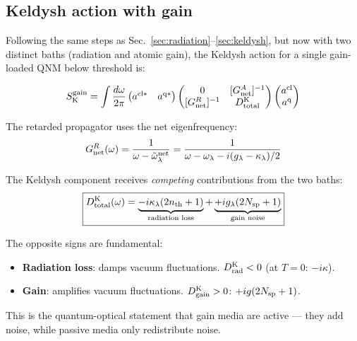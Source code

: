 \documentclass[12pt]{article}
\newcommand{\cl}{{\rm cl}}
\newcommand{\q}{{\rm q}}
\newcommand{\Keldysh}{{\rm K}}
\newcommand{\tomega}{\tilde{\omega}}
\begin{document}
\subsection{Keldysh action with gain}
\label{sec:keldysh_gain}

Following the same steps as Sec.~\ref{sec:radiation}--\ref{sec:keldysh},
but now with two distinct baths (radiation and atomic gain), the Keldysh
action for a single gain-loaded QNM below threshold is:

\begin{equation}
  S_\Keldysh^{\rm gain} = \int\frac{d\omega}{2\pi}
  \begin{pmatrix}a^{\cl*} & a^{\q*}\end{pmatrix}
  \begin{pmatrix}
    0 & [G^A_{\rm net}]^{-1}\\
    [G^R_{\rm net}]^{-1} & D^\Keldysh_{\rm total}
  \end{pmatrix}
  \begin{pmatrix}a^\cl\\a^\q\end{pmatrix}
  \label{eq:keldysh_gain_action}
\end{equation}

The retarded propagator uses the net eigenfrequency:
\begin{equation}
  G^R_{\rm net}(\omega) =
  \frac{1}{\omega - \tomega_\lambda^{\rm net}}
  = \frac{1}{\omega - \omega_\lambda - i(g_\lambda-\kappa_\lambda)/2}
  \label{eq:GR_net}
\end{equation}

The Keldysh component receives \emph{competing} contributions from the
two baths:
\begin{equation}
  \boxed{
  D^\Keldysh_{\rm total}(\omega) =
  \underbrace{-i\kappa_\lambda(2n_{\rm th}+1)}_{\text{radiation loss}}
  +\underbrace{+ig_\lambda(2N_{\rm sp}+1)}_{\text{gain noise}}
  }
  \label{eq:DK_gain}
\end{equation}

The opposite signs are fundamental:
\begin{itemize}
  \item \textbf{Radiation loss}: damps vacuum fluctuations.
    $D^\Keldysh_{\rm rad} < 0$ (at $T=0$: $-i\kappa$).
  \item \textbf{Gain}: amplifies vacuum fluctuations.
    $D^\Keldysh_{\rm gain} > 0$: $+ig(2N_{\rm sp}+1)$.
\end{itemize}

This is the quantum-optical statement that gain media are active ---
they add noise, while passive media only redistribute noise.
\end{document}
